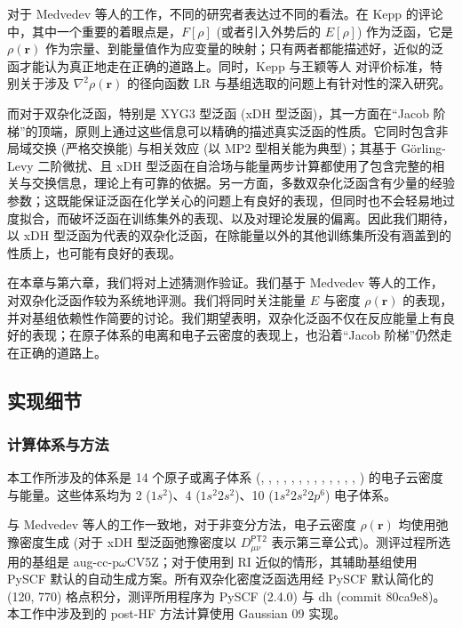 对于 Medvedev 等人的工作，不同的研究者表达过不同的看法。在 Kepp 的评论\cite{Kepp-Kepp.S.2017}中，其中一个重要的着眼点是，$F[\rho]$ (或者引入外势后的 $E[\rho]$) 作为泛函，它是 $\rho(\bm{r})$ 作为宗量、到能量值作为应变量的映射；只有两者都能描述好，近似的泛函才能认为真正地走在正确的道路上。同时，Kepp\cite{Kepp-Kepp.S.2017} 与王颖等人\cite{Wang-He.JCTC.2017} 对评价标准，特别关于涉及 $\nabla^2 \rho(\bm{r})$ 的径向函数 LR 与基组选取的问题上有针对性的深入研究。

而对于双杂化泛函，特别是 XYG3 型泛函 (xDH 型泛函)\cite{Zhang-Goddard.PNAS.2009}，其一方面在“Jacob 阶梯”的顶端，原则上通过这些信息可以精确的描述真实泛函的性质。它同时包含非局域交换 (严格交换能) 与相关效应 (以 MP2 型相关能为典型)；其基于 G\"orling-Levy 二阶微扰\cite{Goerling-Levy.PRB.1993, Goerling-Levy.PRA.1994}、且 xDH 型泛函在自洽场与能量两步计算都使用了包含完整的相关与交换信息，理论上有可靠的依据。另一方面，多数双杂化泛函含有少量的经验参数；这既能保证泛函在化学关心的问题上有良好的表现，但同时也不会轻易地过度拟合，而破坏泛函在训练集外的表现、以及对理论发展的偏离。因此我们期待，以 xDH 型泛函为代表的双杂化泛函，在除能量以外的其他训练集所没有涵盖到的性质上，也可能有良好的表现。

在本章与第六章，我们将对上述猜测作验证。我们基于 Medvedev 等人的工作\cite{Medvedev-Lyssenko.S.2017}，对双杂化泛函作较为系统地评测。我们将同时关注能量 $E$ 与密度 $\rho(\bm{r})$ 的表现，并对基组依赖性作简要的讨论。我们期望表明，双杂化泛函不仅在反应能量上有良好的表现\cite{Su-Xu.WCMS.2016, Goerigk-Grimme.PCCP.2017, Zhang-Xu.JPCL.2021, Santra-Martin.JPCL.2021}；在原子体系的电离和电子云密度的表现上，也沿着“Jacob 阶梯”仍然走在正确的道路上。

\subsection{实现细节}

\subsubsection{计算体系与方法}

本工作所涉及的体系是 14 个原子或离子体系 (, , , , , , , , , , , , , ) 的电子云密度与能量。这些体系均为 2 ($1s^2$)、4 ($1s^2 2s^2$)、10 ($1s^2 2s^2 2p^6$) 电子体系。

与 Medvedev 等人的工作\cite{Medvedev-Lyssenko.S.2017}一致地，对于非变分方法，电子云密度 $\rho (\bm{r})$ 均使用弛豫密度生成 (对于 xDH 型泛函弛豫密度以 $D_{\mu \nu}^\textsf{PT2}$ 表示\alert{第三章公式})。测评过程所选用的基组是 aug-cc-p$\omega$CV5Z\cite{Dunning-Dunning.JCP.1989, Kendall-Harrison.JCP.1992, Peterson-Dunning.JCP.2002}；对于使用到 RI 近似的情形，其辅助基组使用 PySCF 默认的自动生成方案\cite{Stoychev-Neese.JCTC.2017}。所有双杂化密度泛函选用经 PySCF 默认简化的 (120, 770) 格点积分，测评所用程序为 PySCF (2.4.0)\cite{Sun-Chan.WCMS.2018, Sun-Chan.JCP.2020} 与 dh (commit 80ca9e8)。本工作中涉及到的 post-HF 方法计算使用 Gaussian 09\cite{Gaussian09} 实现。

